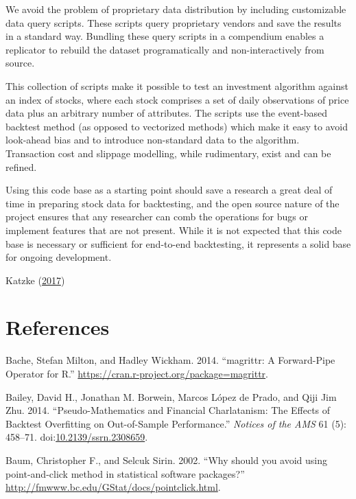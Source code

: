 \documentclass[11pt,preprint, authoryear]{elsarticle}
\numberwithin{equation}{section}
\numberwithin{figure}{section}
\numberwithin{table}{section}
\begin{document}
We avoid the problem of proprietary data distribution by including
customizable data query scripts. These scripts query proprietary vendors
and save the results in a standard way. Bundling these query scripts in
a compendium enables a replicator to rebuild the dataset programatically
and non-interactively from source.

This collection of scripts make it possible to test an investment
algorithm against an index of stocks, where each stock comprises a set
of daily observations of price data plus an arbitrary number of
attributes. The scripts use the event-based backtest method (as opposed
to vectorized methods) which make it easy to avoid look-ahead bias and
to introduce non-standard data to the algorithm. Transaction cost and
slippage modelling, while rudimentary, exist and can be refined.

Using this code base as a starting point should save a research a great
deal of time in preparing stock data for backtesting, and the open
source nature of the project ensures that any researcher can comb the
operations for bugs or implement features that are not present. While it
is not expected that this code base is necessary or sufficient for
end-to-end backtesting, it represents a solid base for ongoing
development.

Katzke (\protect\hyperlink{ref-Katzke2017}{2017})

\section*{References}\label{references}

\hypertarget{refs}{}
\hypertarget{ref-Bache2014}{}
Bache, Stefan Milton, and Hadley Wickham. 2014. ``magrittr: A
Forward-Pipe Operator for R.''
\url{https://cran.r-project.org/package=magrittr}.

\hypertarget{ref-Bailey2014}{}
Bailey, David H., Jonathan M. Borwein, Marcos López de Prado, and Qiji
Jim Zhu. 2014. ``Pseudo-Mathematics and Financial Charlatanism: The
Effects of Backtest Overfitting on Out-of-Sample Performance.''
\emph{Notices of the AMS} 61 (5): 458--71.
doi:\href{https://doi.org/10.2139/ssrn.2308659}{10.2139/ssrn.2308659}.

\hypertarget{ref-Baum2002}{}
Baum, Christopher F., and Selcuk Sirin. 2002. ``Why should you avoid
using point-and-click method in statistical software packages?''
\url{http://fmwww.bc.edu/GStat/docs/pointclick.html}.
\end{document}
